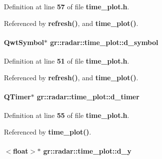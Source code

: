 Definition at line {\bf 57} of file {\bf time\+\_\+plot.\+h}.



Referenced by {\bf refresh()}, and {\bf time\+\_\+plot()}.

\paragraph[{d\+\_\+symbol}]{\setlength{\rightskip}{0pt plus 5cm}Qwt\+Symbol$\ast$ gr\+::radar\+::time\+\_\+plot\+::d\+\_\+symbol\hspace{0.3cm}{\ttfamily [private]}}\label{classgr_1_1radar_1_1time__plot_a0a29e383f7b76277efd359cfbade2e4c}


Definition at line {\bf 51} of file {\bf time\+\_\+plot.\+h}.



Referenced by {\bf refresh()}, and {\bf time\+\_\+plot()}.

\paragraph[{d\+\_\+timer}]{\setlength{\rightskip}{0pt plus 5cm}Q\+Timer$\ast$ gr\+::radar\+::time\+\_\+plot\+::d\+\_\+timer\hspace{0.3cm}{\ttfamily [private]}}\label{classgr_1_1radar_1_1time__plot_a2d0c6de124e13d947cf15ed33c87118c}


Definition at line {\bf 55} of file {\bf time\+\_\+plot.\+h}.



Referenced by {\bf time\+\_\+plot()}.

\paragraph[{d\+\_\+y}]{$<$float$>$$\ast$ gr\+::radar\+::time\+\_\+plot\+::d\+\_\+y\hspace{0.3cm}{\ttfamily [private]}}\label{classgr_1_1radar_1_1time__plot_abfbae36c72ecf816b91ada70c3973d3f}


